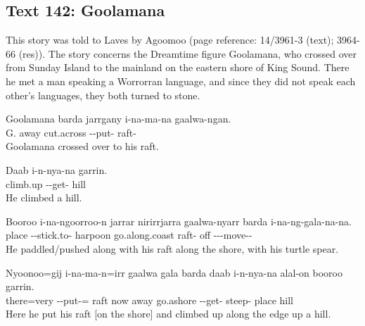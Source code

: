 \subsection{Text 142: Goolamana}\label{Goolamana}
This story was told to Laves by Agoomoo (page reference: 14/3961-3 (text); 3964-66 (res)). The story concerns the Dreamtime figure Goolamana, who crossed over from Sunday Island to the mainland on the eastern shore of King Sound. There he met a man speaking a Worrorran language, and since they did not speak each other's languages, they both turned to stone.

\setcounter{exxy}{0}\begin{exye}
\exy {}
\gll Goolamana barda   jarrgany   i-na-ma-na            gaalwa-ngan.\\
G.        away    cut.across --put- raft-\\
\glt Goolamana crossed over to his raft.

\exy {}
\gll Daab     i-n-nya-na            garrin.\\
climb.up --get- hill\\
\glt  He climbed a hill.

\exy {}
\gll Booroo i-na-ngoorroo-n          jarrar  nirirrjarra         gaalwa-nyarr  barda   i-na-ng-gala-na-na.\\
place  --stick.to- harpoon go.along.coast raft-   off     ---move--\\
\glt  He paddled/pushed along with his raft along the shore, with his turtle spear.

\exy {}
\gll Nyoonoo=gij    i-na-ma-n=irr  gaalwa gala barda   daab      i-n-nya-na            alal-on      booroo garrin.\\
there=very   --put-=  raft   now  away    go.ashore --get- steep- place  hill\\
\glt  Here he put his raft [on the shore] and climbed up along the edge up a hill.


\end{exye}
